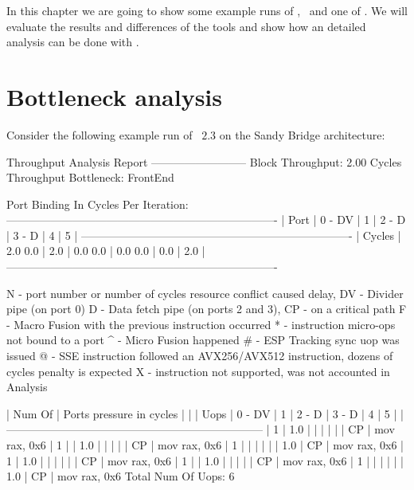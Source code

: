 In this chapter we are going to show some example runs of \iaca, \suaca\ and one of \osaca. We will evaluate the results and differences of the tools and show how an detailed analysis can be done with \suaca.

\section{Bottleneck analysis}

Consider the following example run of \iaca\ $2.3$ on the Sandy Bridge architecture:

\begin{example}
        Throughput Analysis Report
        --------------------------
        Block Throughput: 2.00 Cycles       Throughput Bottleneck: FrontEnd
        
        Port Binding In Cycles Per Iteration:
        -------------------------------------------------------------------------
        |  Port  |  0   -  DV  |  1   |  2   -  D   |  3   -  D   |  4   |  5   |
        -------------------------------------------------------------------------
        | Cycles | 2.0    0.0  | 2.0  | 0.0    0.0  | 0.0    0.0  | 0.0  | 2.0  |
        -------------------------------------------------------------------------
        
        N - port number or number of cycles resource conflict caused delay, DV - Divider pipe (on port 0)
        D - Data fetch pipe (on ports 2 and 3), CP - on a critical path
        F - Macro Fusion with the previous instruction occurred
        * - instruction micro-ops not bound to a port
        ^ - Micro Fusion happened
        # - ESP Tracking sync uop was issued
        @ - SSE instruction followed an AVX256/AVX512 instruction, dozens of cycles penalty is expected
        X - instruction not supported, was not accounted in Analysis
        
        | Num Of |              Ports pressure in cycles               |    |
        |  Uops  |  0  - DV  |  1  |  2  -  D  |  3  -  D  |  4  |  5  |    |
        ---------------------------------------------------------------------
        |   1    | 1.0       |     |           |           |     |     | CP | mov rax, 0x6
        |   1    |           | 1.0 |           |           |     |     | CP | mov rax, 0x6
        |   1    |           |     |           |           |     | 1.0 | CP | mov rax, 0x6
        |   1    | 1.0       |     |           |           |     |     | CP | mov rax, 0x6
        |   1    |           | 1.0 |           |           |     |     | CP | mov rax, 0x6
        |   1    |           |     |           |           |     | 1.0 | CP | mov rax, 0x6
        Total Num Of Uops: 6
\end{example}


